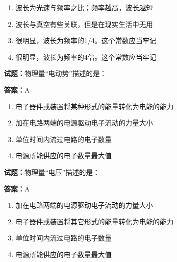 \documentclass{ctexbook}
\begin{document}
\begin{enumerate}[leftmargin=3em]
  \item 波长为光速与频率之比；频率越高，波长越短 

  \item 波长与真空有些关联，但是在现实生活中无用 

  \item 很明显，波长为频率的1/4。这个常数应当牢记 

  \item 很明显，波长为频率的4倍。这个常数应当牢记 

\end{enumerate}





\vspace{1em}

\textbf{试题：}物理量“电动势”描述的是： 

\textbf{答案：}A 

\begin{enumerate}[leftmargin=3em]
  \item 电子器件或装置将某种形式的能量转化为电能的能力 

  \item 加在电路两端的电源驱动电子流动的力量大小 

  \item 单位时间内流过电路的电子数量 

  \item 电源所能供应的电子数量最大值 

\end{enumerate}





\vspace{1em}

\textbf{试题：}物理量“电压”描述的是： 

\textbf{答案：}A 

\begin{enumerate}[leftmargin=3em]
  \item 加在电路两端的电源驱动电子流动的力量大小 

  \item 电子器件或装置将其它形式的能量转化为电能的能力 

  \item 单位时间内流过电路的电子数量 

  \item 电源所能供应的电子数量最大值 

\end{enumerate}
\end{document}

